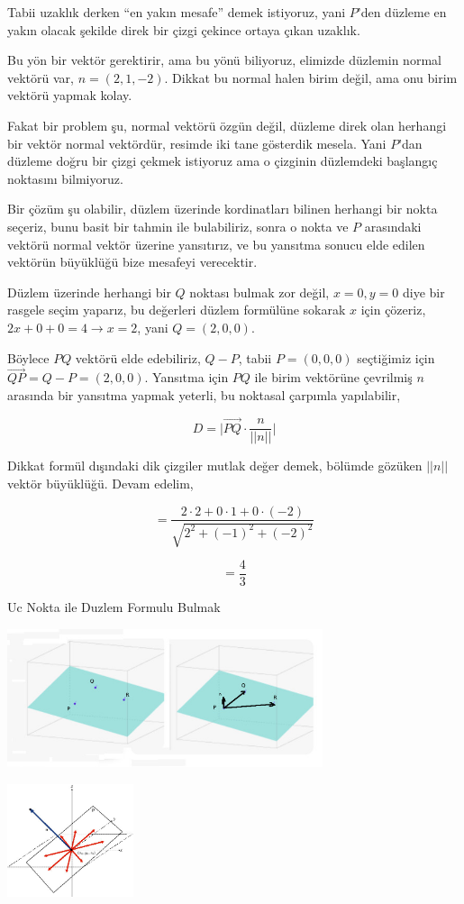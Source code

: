 \documentclass[12pt,fleqn]{article}\usepackage{../../common}
\begin{document}
Tabii uzaklık derken ``en yakın mesafe'' demek istiyoruz, yani $P$'den düzleme
en yakın olacak şekilde direk bir çizgi çekince ortaya çıkan uzaklık.

Bu yön bir vektör gerektirir, ama bu yönü biliyoruz, elimizde düzlemin normal
vektörü var, $n = (2,1,-2)$. Dikkat bu normal halen birim değil, ama onu birim
vektörü yapmak kolay.

Fakat bir problem şu, normal vektörü özgün değil, düzleme direk olan herhangi
bir vektör normal vektördür, resimde iki tane gösterdik mesela. Yani $P$'dan
düzleme doğru bir çizgi çekmek istiyoruz ama o çizginin düzlemdeki başlangıç
noktasını bilmiyoruz. 

Bir çözüm şu olabilir, düzlem üzerinde kordinatları bilinen herhangi bir nokta
seçeriz, bunu basit bir tahmin ile bulabiliriz, sonra o nokta ve $P$ arasındaki
vektörü normal vektör üzerine yansıtırız, ve bu yansıtma sonucu elde edilen
vektörün büyüklüğü bize mesafeyi verecektir.

Düzlem üzerinde herhangi bir $Q$ noktası bulmak zor değil, $x=0,y=0$ diye bir
rasgele seçim yaparız, bu değerleri düzlem formülüne sokarak $x$ için çözeriz,
$2x + 0 + 0 = 4 \to x = 2$, yani $Q = (2,0,0)$.

Böylece $PQ$ vektörü elde edebiliriz, $Q - P$, tabii $P = (0,0,0)$ seçtiğimiz
için $\vec{QP} = Q - P = (2,0,0)$. Yansıtma için $PQ$ ile birim vektörüne
çevrilmiş $n$ arasında bir yansıtma yapmak yeterli, bu noktasal çarpımla
yapılabilir,

$$
D =  \bigg| \vec{PQ} \cdot \frac{n}{||n||} \bigg|
$$

Dikkat formül dışındaki dik çizgiler mutlak değer demek, bölümde gözüken $||n||$
vektör büyüklüğü. Devam edelim,

$$
= \frac{2 \cdot 2 + 0 \cdot 1 + 0 \cdot (-2) }{ \sqrt{2^2 + (-1)^2 + (-2)^2} } 
$$

$$
= \frac{4}{3}
$$

Uc Nokta ile Duzlem Formulu Bulmak

\includegraphics[width=25em]{4_8.jpg}

\includegraphics[width=10em]{4_7.jpg}
\end{document}
